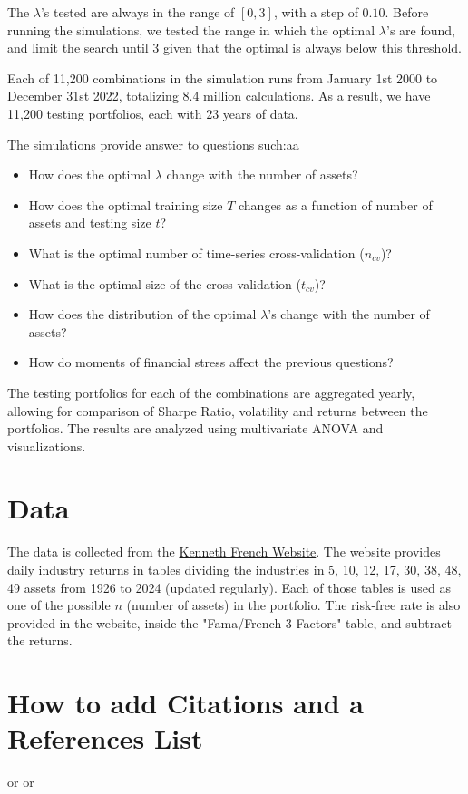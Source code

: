 \documentclass{article}
\begin{document}
The $\lambda$'s tested are always in the range of $[0, 3]$, with a step of $0.10$. Before running the simulations, we tested the range in which the optimal $\lambda$'s are found, and limit the search until $3$ given that the optimal is always below this threshold.

Each of 11,200 combinations in the simulation runs from January 1st 2000 to December 31st 2022, totalizing 8.4 million calculations. As a result, we have 11,200 testing portfolios, each with 23 years of data.

The simulations provide answer to questions such:aa
\begin{itemize}
    \item How does the optimal $\lambda$ change with the number of assets?
    \item How does the optimal training size $T$ changes as a function of number of assets and testing size $t$?
    \item What is the optimal number of time-series cross-validation ($n_{cv}$)?
    \item What is the optimal size of the cross-validation ($t_{cv}$)?
    \item How does the distribution of the optimal $\lambda$'s change with the number of assets?
    \item How do moments of financial stress affect the previous questions?
\end{itemize}

The testing portfolios for each of the combinations are aggregated yearly, allowing for comparison of Sharpe Ratio, volatility and returns between the portfolios. The results are analyzed using multivariate ANOVA and visualizations.

\section{Data}
The data is collected from the \hyperlink{https://mba.tuck.dartmouth.edu/pages/faculty/ken.french/data_library.html}{Kenneth French Website}. The website provides daily industry returns in tables dividing the industries in 5, 10, 12, 17, 30, 38, 48, 49 assets from 1926 to 2024 (updated regularly). Each of those tables is used as one of the possible $n$ (number of assets) in the portfolio. The risk-free rate is also provided in the website, inside the "Fama/French 3 Factors" table, and subtract the returns.

\section{How to add Citations and a References List}

\cite{markowitz1952portfolio} or \cite{sharpe1964capital} or \cite{bruder2013regularization}



\end{document}
